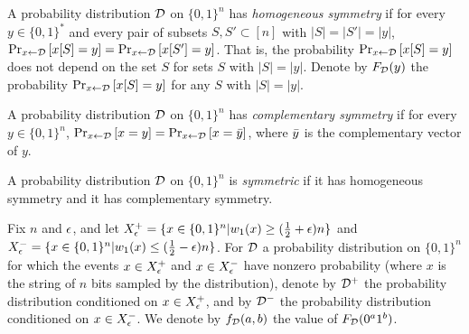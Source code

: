 \begin{definition}
A probability distribution $\mathcal{D}$ on $\{0, 1\}^n$ has \emph{homogeneous
symmetry} if for every $y \in \{0, 1\}^*$ and every pair of subsets $S, S' \subset [n]$
with $|S| = |S'| = |y|$, 
$\text{Pr}_{x \leftarrow \mathcal{D}}\left[x[S] = y\right] = \text{Pr}_{x \leftarrow \mathcal{D}}\left[x[S'] = y\right]$.
That is, the probability $\text{Pr}_{x \leftarrow \mathcal{D}}\left[x[S] = y\right]$ does not depend
on the set $S$ for sets $S$ with $|S| = |y|$. Denote by $F_{\mathcal{D}}(y)$ the probability
$\text{Pr}_{x \leftarrow \mathcal{D}}\left[x[S] = y\right]$ for any $S$ with $|S| = |y|$.

A probability distribution $\mathcal{D}$ on $\{0, 1\}^n$ has \emph{complementary symmetry} if for every
$y \in \{0, 1\}^n$, $\text{Pr}_{x \leftarrow \mathcal{D}}\left[x = y\right] = \text{Pr}_{x \leftarrow \mathcal{D}}\left[x = \bar{y}\right]$,
where $\bar{y}$ is the complementary vector of $y$.

A probability distribution $\mathcal{D}$ on $\{0, 1\}^n$ is \emph{symmetric} if it has homogeneous symmetry
and it has complementary symmetry. 
\end{definition}

Fix $n$ and $\epsilon$, and let $X^+_\epsilon = \{x \in \{0, 1\}^n | w_1(x) \geq (\frac{1}{2}+\epsilon )n \}$
and $X^-_\epsilon = \{x \in \{0, 1\}^n | w_1(x) \leq (\frac{1}{2}-\epsilon )n \}$.
For $\mathcal{D}$ a probability distribution on $\{0, 1\}^n$ for which
the events $x \in X^+_\epsilon$ and $x \in X^-_\epsilon$ have nonzero probability (where $x$
is the string of $n$ bits sampled by the distribution), 
denote by $\mathcal{D}^+$ the probability distribution conditioned on $x \in X^+_\epsilon$,
and by $\mathcal{D}^-$ the probability distribution conditioned on $x \in X^-_\epsilon$.
We denote by $f_{\mathcal{D}}(a, b)$ the value of $F_{\mathcal{D}}(0^a 1^b)$.

